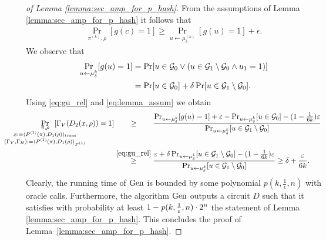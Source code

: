 \begin{proof}[of Lemma \ref{lemma:sec_amp_for_p_hash}]
 From the assumptions of Lemma \ref{lemma:sec_amp_for_p_hash} it follows that
 \begin{align}
   \label{eq:lemma_assum}
   \Pr_{\pi^{(k)}, \rho} [g(c) = 1] \geq \Pr_{u \leftarrow \mu_{\delta}^{(k)}}[g(u) = 1] + \epsilon.
 \end{align}
We observe that
\begin{align}
  \label{eq:gu_rel}
\underset{u \leftarrow \mu_{\delta}^k}{\Pr}[g(u) = 1]
&= \Pr[u \in \mathcal{G}_0 \lor ( u \in \mathcal{G}_1 \setminus \mathcal{G}_0 \land u_1 = 1)] \notag\\
&= \Pr[u \in \mathcal{G}_0] + \delta \Pr[u \in \mathcal{G}_1 \setminus \mathcal{G}_0].
\end{align}
 Using \eqref{eq:gu_rel} and \eqref{eq:lemma_assum} we obtain
 \begin{align}
   \label{eq:proof_final}
   \IndI
\underset{
  \mathclap{
  \substack{\pi, \rho \\ x := \langle P^{(1)}(\pi), D_1(\rho) \rangle_{\text{trans}}
    \\ (\Gamma_V, \Gamma_H) := \langle P^{(1)}(\pi), D_1 (\rho) \rangle_{P^{(1)}} }}}
{\Pr}\mkern13mu[\Gamma_V(D_2(x, \rho)) = 1]
 &\stackrel{\hphantom{\eqref{eq:gu_rel}}}{\geq} \frac{ {\Pr}_{u \leftarrow \mu_{\delta}^{k}}[g(u) = 1] + \epsilon -
 \Pr_{u \leftarrow \mu_{\delta}^{k}}[u \in \cG_0] - (1 - \frac{1}{6k})\epsilon} {\Pr_{u \leftarrow \mu_{\delta}^{k}}[u \in \cG_1 \setminus \cG_0]} \notag\\
 &\stackrel{\eqref{eq:gu_rel}}{\geq} \frac{\epsilon + \delta\Pr_{u \leftarrow \mu_{\delta}^{k}}[u \in \cG_1 \setminus \cG_0] - (1 - \frac{1}{6k})\epsilon}
{\Pr_{u \leftarrow \mu_{\delta}^{k}}[u \in \cG_1 \setminus \cG_0]} \geq \delta + \frac{\epsilon}{6k}.
\end{align}
Clearly, the running time of $\operatorname{\text{Gen}}$ is bounded by some polynomial $p(k, \frac{1}{\epsilon}, n)$ with oracle calls.
Furthermore, the algorithm $\operatorname{\text{Gen}}$ outputs a circuit $D$ such that it satisfies with probability at least $1 - \operatorname{\mathit{p}}(k, \frac{1}{\varepsilon}, n) \cdot 2^n$
the statement of Lemma \ref{lemma:sec_amp_for_p_hash}. This concludes the proof of Lemma~\ref{lemma:sec_amp_for_p_hash}.
\end{proof}
%
